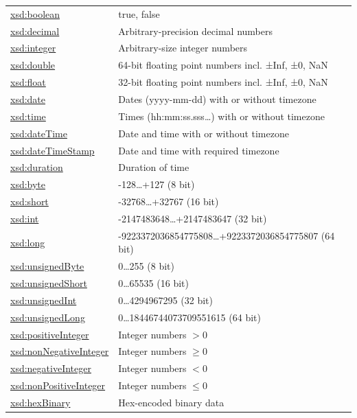 \documentclass[8pt]{beamer}
\begin{document}
\begin{frame}
\begin{small}
\begin{tabular}{|l|l|}
 \hline
\url{xsd:boolean} & true, false\\
\url{xsd:decimal} & Arbitrary-precision decimal numbers\\
\url{xsd:integer} & Arbitrary-size integer numbers\\
\url{xsd:double} & 64-bit floating point numbers incl. ±Inf, ±0, NaN\\
\url{xsd:float} & 32-bit floating point numbers incl. ±Inf, ±0, NaN\\
\url{xsd:date} & Dates (yyyy-mm-dd) with or without timezone\\
\url{xsd:time} & Times (hh:mm:ss.sss…) with or without timezone\\
\url{xsd:dateTime} & Date and time with or without timezone\\
\url{xsd:dateTimeStamp} & Date and time with required timezone\\
\url{xsd:duration} & Duration of time\\
\url{xsd:byte} & -128\ldots+127 (8 bit)\\
\url{xsd:short} & -32768\ldots+32767 (16 bit) \\
\url{xsd:int} & -2147483648\ldots+2147483647 (32 bit)\\
\url{xsd:long} & -9223372036854775808\ldots+9223372036854775807 (64 bit)\\
\url{xsd:unsignedByte} & 0\ldots255 (8 bit)\\
\url{xsd:unsignedShort} & 0\ldots65535 (16 bit)\\
\url{xsd:unsignedInt} & 0\ldots4294967295 (32 bit)\\
\url{xsd:unsignedLong} & 0\ldots18446744073709551615 (64 bit)\\
\url{xsd:positiveInteger} & Integer numbers $>0$\\
\url{xsd:nonNegativeInteger} & Integer numbers $\geq 0$\\
\url{xsd:negativeInteger} & Integer numbers $<0$\\
\url{xsd:nonPositiveInteger} & Integer numbers $\leq 0$\\
\url{xsd:hexBinary} & Hex-encoded binary data\\
\hline
\end{tabular}
\end{small}
\end{frame}
\end{document}
